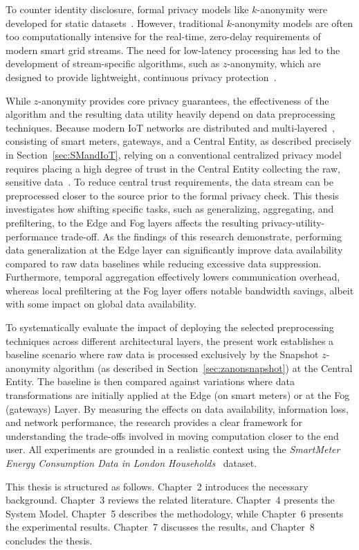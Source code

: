 To counter identity disclosure, formal privacy models like $k$-anonymity were developed for static datasets~\cite{Sweeney_kanon}. However, traditional $k$-anonymity models are often too computationally intensive for the real-time, zero-delay requirements of modern smart grid streams. The need for low-latency processing has led to the development of stream-specific algorithms, such as $z$-anonymity, which are designed to provide lightweight, continuous privacy protection~\cite{zanonDataStreams}.

While $z$-anonymity provides core privacy guarantees, the effectiveness of the algorithm and the resulting data utility heavily depend on data preprocessing techniques. Because modern \ac{IoT} networks are distributed and multi-layered~\cite{reviewIoT}, consisting of smart meters, gateways, and a Central Entity, as described precisely in Section~\ref{sec:SMandIoT}, relying on a conventional centralized privacy model requires placing a high degree of trust in the Central Entity collecting the raw, sensitive data~\cite{dezent2025}. To reduce central trust requirements, the data stream can be preprocessed closer to the source prior to the formal privacy check. This thesis investigates how shifting specific tasks, such as generalizing, aggregating, and prefiltering, to the Edge and Fog layers affects the resulting privacy-utility-performance trade-off. As the findings of this research demonstrate, performing data generalization at the Edge layer can significantly improve data availability compared to raw data baselines while reducing excessive data suppression. Furthermore, temporal aggregation effectively lowers communication overhead, whereas local prefiltering at the Fog layer offers notable bandwidth savings, albeit with some impact on global data availability.

To systematically evaluate the impact of deploying the selected preprocessing techniques across different architectural layers, the present work establishes a baseline scenario where raw data is processed exclusively by the Snapshot $z$-anonymity algorithm (as described in Section~\ref{sec:zanonsnapshot}) at the Central Entity. The baseline is then compared against variations where data transformations are initially applied at the Edge (on smart meters) or at the Fog (gateways) Layer. By measuring the effects on data availability, information loss, and network performance, the research provides a clear framework for understanding the trade-offs involved in moving computation closer to the end user. All experiments are grounded in a realistic context using the \textit{SmartMeter Energy Consumption Data in London Households}~\cite{londonSmartMeter2014} dataset. 

This thesis is structured as follows. Chapter~2 introduces the necessary background. Chapter~3 reviews the related literature. Chapter~4 presents the System Model. Chapter~5 describes the methodology, while Chapter~6 presents the experimental results. Chapter~7 discusses the results, and Chapter~8 concludes the thesis.